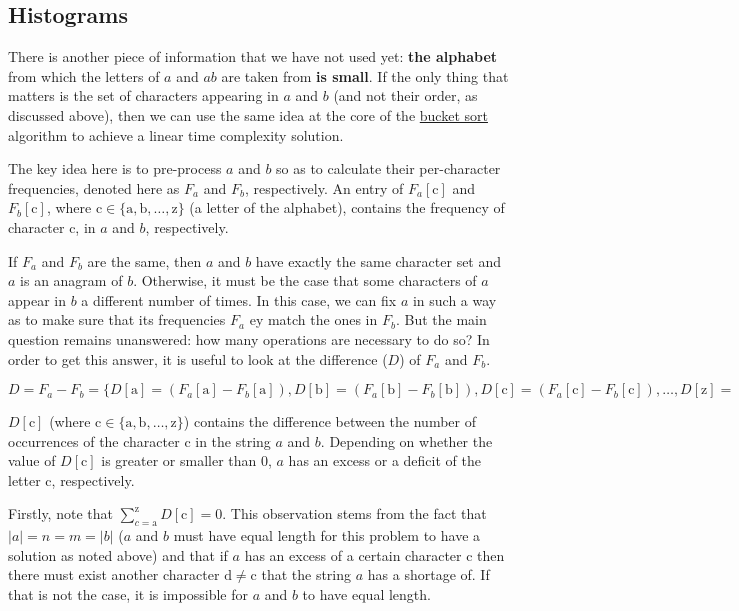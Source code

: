 \subsection{Histograms}
\label{sec:anagrams:histograms}


There is another piece of information that we have not used yet: \textbf{the alphabet} from which the
letters of $a$ and $ab$ are taken from \textbf{is small}. 
If the only thing that matters is the set of characters appearing in $a$ and $b$ (and not their order, as discussed above),
then we can use the same idea at the core of the \href{https://en.wikipedia.org/wiki/Bucket_sort}{bucket sort} algorithm to achieve a linear time complexity solution.


The key idea here is to pre-process $a$ and $b$ so as to calculate their per-character frequencies, denoted here as $F_a$ and $F_b$, respectively.
An entry of $F_a[\mathrm{c}]$ and $F_b[\mathrm{c}]$, where $\mathrm{c} \in \{\mathrm{a},\mathrm{b},\ldots,\mathrm{z}\}$ (a letter of the alphabet), contains the frequency of character $\mathrm{c}$, in $a$ and $b$, respectively.


If $F_a$ and $F_b$ are the same, then $a$ and $b$ have exactly the same character set and $a$ is an anagram of $b$.
Otherwise, it must be the case that some characters of $a$ appear in $b$ a different number of times.
In this case, we can fix $a$ in such a way as to make sure that its frequencies $F_a$ ey match the ones in $F_b$. 
But the main question remains unanswered: how many operations are necessary to do so?  In order to get this answer, it is useful to look at
the difference ($D$) of $F_a$ and $F_b$.

$D = F_a - F_b = \{D[\mathrm{a}] = (F_a[\mathrm{a}] - F_b[\mathrm{a}]), D[\mathrm{b}] = (F_a[\mathrm{b}] - F_b[\mathrm{b}]), D[\mathrm{c}] = (F_a[\mathrm{c}] - F_b[\mathrm{c}]), \ldots, D[\mathrm{z}] = (F_a[\mathrm{z}] - F_b[\mathrm{z}])\}
$

$D[\mathrm{c}]$ (where $\mathrm{c} \in \{\mathrm{a},\mathrm{b},\ldots,\mathrm{z}\}$) contains the difference between the number of occurrences of the character $\mathrm{c}$ in the string $a$ and $b$. Depending on whether the value of $D[\mathrm{c}]$  is greater or smaller than $0$, $a$ has an excess or a deficit of the letter c, respectively.

Firstly, note that $\sum_{c=\mathrm{a}}^{\mathrm{z}} D[\mathrm{c}] = 0$. This observation stems from the fact that $|a|=n=m=|b|$ ($a$ and $b$ must have equal length for this problem to have a solution as noted above) and that if $a$ has an excess of a certain character $\mathrm{c}$ then there must exist another character $\mathrm{d} \neq \mathrm{c}$ that the string $a$ has a shortage of. If that is not the case, it is impossible for $a$ and $b$ to have equal length.

